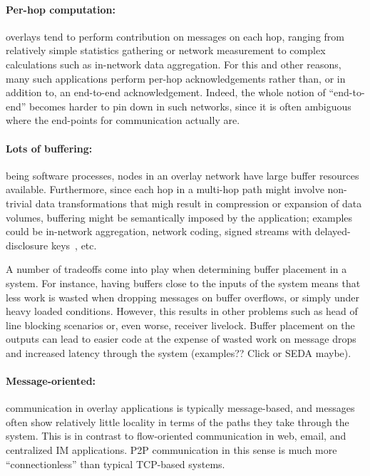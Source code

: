 \paragraph{Per-hop computation:} overlays tend to perform contribution
on messages on each hop, ranging from relatively simple statistics
gathering or network measurement to complex calculations such as
in-network data aggregation.  For this and other reasons, many such
applications perform per-hop acknowledgements rather than, or in
addition to, an end-to-end acknowledgement.  Indeed, the whole notion
of ``end-to-end'' becomes harder to pin down in such networks, since
it is often ambiguous where the end-points for communication actually
are. 

\paragraph{Lots of buffering:} being software processes, nodes in an
overlay network have large buffer resources available.  Furthermore,
since each hop in a multi-hop path might involve non-trivial data
transformations that migh result in compression or expansion of data
volumes, buffering might be semantically imposed by the application;
examples could be in-network aggregation, network coding, signed streams
with delayed-disclosure keys~\cite{Perrig2000}, etc.

A number of tradeoffs come into play when determining buffer placement
in a system. For instance, having buffers close to the inputs of the system
means that less work is wasted when dropping messages on buffer overflows,
or simply under heavy loaded conditions. However, this results in other problems 
such as head of line blocking scenarios or, even worse, receiver livelock. Buffer placement on the outputs can lead to easier code at the expense of wasted work on
message drops and increased latency through the system 
(examples?? Click or SEDA maybe).


\paragraph{Message-oriented:} communication in overlay applications is
typically message-based, and messages often show relatively little
locality in terms of the paths they take through the system. This is
in contrast to flow-oriented communication in web, email, and
centralized IM applications.  P2P communication in this sense is much
more ``connectionless'' than typical TCP-based systems.

